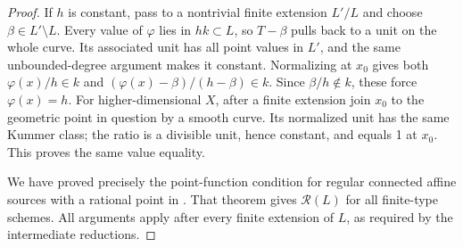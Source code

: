 \begin{proof}
If \(h\) is constant, pass to a nontrivial finite extension
\(L'/L\) and choose \(\beta\in L'\setminus L\).
Every value of \(\varphi\) lies in \(hk\subset L\), so
\(T-\beta\) pulls back to a unit on the whole curve. Its
associated unit has all point values in \(L'\), and the same
unbounded-degree argument makes it constant. Normalizing at
\(x_0\) gives both
\(\varphi(x)/h\in k\) and
\((\varphi(x)-\beta)/(h-\beta)\in k\). Since \(\beta/h\notin k\),
these force \(\varphi(x)=h\). For higher-dimensional \(X\),
after a finite extension join \(x_0\) to the geometric point
in question by a smooth curve. Its normalized unit has the same
Kummer class; the ratio is a divisible unit, hence constant, and
equals 1 at \(x_0\). This proves the same value equality.

We have proved precisely the point-function condition for regular
connected affine sources with a rational point in
\citet[Theorem~4.18(5)]{FF_CHW2024}. That theorem gives
\(\mathcal R(L)\) for all finite-type schemes. All arguments
apply after every finite extension of \(L\), as required by the
intermediate reductions.
\end{proof}

